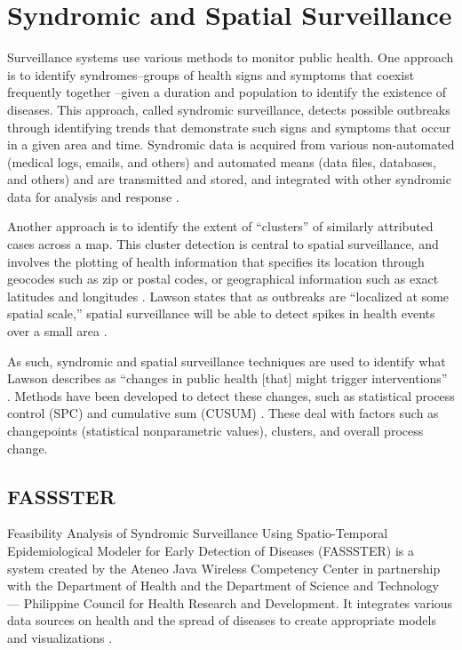 \section{Syndromic and Spatial Surveillance}
Surveillance systems use various methods to monitor public health. One approach is to identify syndromes--groups of health signs and symptoms that coexist frequently together \cite{doh2014manual}--given a duration and population to identify the existence of diseases. This approach, called syndromic surveillance, detects possible outbreaks through identifying trends that demonstrate such signs and symptoms that occur in a given area and time. Syndromic data is acquired from various non-automated (medical logs, emails, and others) and automated means (data files, databases, and others) and are transmitted and stored, and integrated with other syndromic data for analysis and response \cite{mandl2004implementing}.

Another approach is to identify the extent of ``clusters'' of similarly attributed cases across a map. This cluster detection is central to spatial surveillance, and involves the plotting of health information that specifies its location through geocodes such as zip or postal codes, or geographical information such as exact latitudes and longitudes \cite{lawson2005spatial}. Lawson states that as outbreaks are ``localized at some spatial scale,'' spatial surveillance will be able to detect spikes in health events over a small area \cite{lawson2005spatial}.

As such, syndromic and spatial surveillance techniques are used to identify what Lawson describes as ``changes in public health [that] might trigger interventions'' \cite{lawson2005spatial}. Methods have been developed to detect these changes, such as statistical process control (SPC) \cite{oakland2007statistical} and cumulative sum (CUSUM) \cite{fricker2008comparing}. These deal with factors such as changepoints (statistical nonparametric values), clusters, and overall process change. 



\subsection{FASSSTER}
Feasibility Analysis of Syndromic Surveillance Using Spatio-Temporal Epidemiological Modeler for Early Detection of Diseases (FASSSTER) is a system created by the Ateneo Java Wireless Competency Center in partnership with the Department of Health and the Department of Science and Technology — Philippine Council for Health Research and Development. It integrates various data sources on health and the spread of diseases to create appropriate models and visualizations \cite{fassster}.

